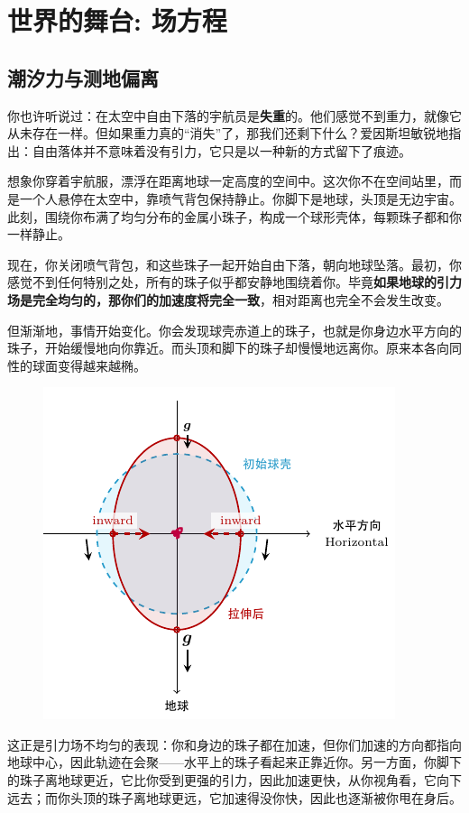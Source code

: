 \documentclass[../Main.tex]{subfiles}
\begin{document}
\section{世界的舞台: 场方程}
\subsection{潮汐力与测地偏离}

你也许听说过：在太空中自由下落的宇航员是\textbf{失重}的。他们感觉不到重力，就像它从未存在一样。但如果重力真的“消失”了，那我们还剩下什么？爱因斯坦敏锐地指出：自由落体并不意味着没有引力，它只是以一种新的方式留下了痕迹。

想象你穿着宇航服，漂浮在距离地球一定高度的空间中。这次你不在空间站里，而是一个人悬停在太空中，靠喷气背包保持静止。你脚下是地球，头顶是无边宇宙。此刻，围绕你布满了均匀分布的金属小珠子，构成一个球形壳体，每颗珠子都和你一样静止。

现在，你关闭喷气背包，和这些珠子一起开始自由下落，朝向地球坠落。最初，你感觉不到任何特别之处，所有的珠子似乎都安静地围绕着你。毕竟\textbf{如果地球的引力场是完全均匀的，那你们的加速度将完全一致}，相对距离也完全不会发生改变。

但渐渐地，事情开始变化。你会发现球壳赤道上的珠子，也就是你身边水平方向的珠子，开始缓慢地向你靠近。而头顶和脚下的珠子却慢慢地远离你。原来本各向同性的球面变得越来越椭。
\begin{figure}[h]
    \centering
    \includegraphics[scale=1.2]{./tikz/fig1.pdf}
\end{figure}

这正是引力场不均匀的表现：你和身边的珠子都在加速，但你们加速的方向都指向地球中心，因此轨迹在会聚——水平上的珠子看起来正靠近你。另一方面，你脚下的珠子离地球更近，它比你受到更强的引力，因此加速更快，从你视角看，它向下远去；而你头顶的珠子离地球更远，它加速得没你快，因此也逐渐被你甩在身后。
\end{document}
